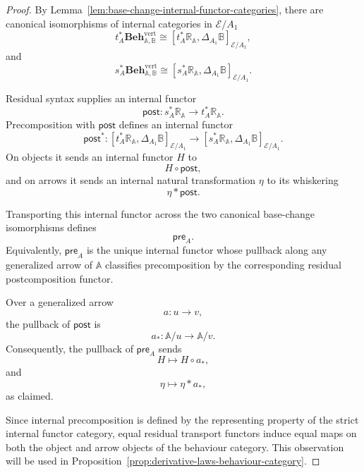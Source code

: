 \begin{proof}
    By Lemma~\ref{lem:base-change-internal-functor-categories}, there are
    canonical isomorphisms of internal categories in \(\mathcal E/A_1\)
    \[
        t_A^*
        \mathbf{Beh}^{\mathrm{vert}}_{\mathbb A,\mathbb B}
        \cong
        [t_A^*\mathbb R_{\mathbb A},
         \Delta_{A_1}\mathbb B]_{\mathcal E/A_1},
    \]
    and
    \[
        s_A^*
        \mathbf{Beh}^{\mathrm{vert}}_{\mathbb A,\mathbb B}
        \cong
        [s_A^*\mathbb R_{\mathbb A},
         \Delta_{A_1}\mathbb B]_{\mathcal E/A_1}.
    \]

    Residual syntax supplies an internal functor
    \[
        \mathsf{post}:
        s_A^*\mathbb R_{\mathbb A}
        \longrightarrow
        t_A^*\mathbb R_{\mathbb A}.
    \]
    Precomposition with \(\mathsf{post}\) defines an internal functor
    \[
        \mathsf{post}^*:
        [t_A^*\mathbb R_{\mathbb A},
         \Delta_{A_1}\mathbb B]_{\mathcal E/A_1}
        \longrightarrow
        [s_A^*\mathbb R_{\mathbb A},
         \Delta_{A_1}\mathbb B]_{\mathcal E/A_1}.
    \]
    On objects it sends an internal functor \(H\) to
    \[
        H\circ\mathsf{post},
    \]
    and on arrows it sends an internal natural transformation \(\eta\) to
    its whiskering
    \[
        \eta\ast\mathsf{post}.
    \]

    Transporting this internal functor across the two canonical
    base-change isomorphisms defines
    \[
        \mathsf{pre}_A.
    \]
    Equivalently, \(\mathsf{pre}_A\) is the unique internal functor whose
    pullback along any generalized arrow of \(\mathbb A\) classifies
    precomposition by the corresponding residual postcomposition functor.

    Over a generalized arrow
    \[
        a:u\to v,
    \]
    the pullback of \(\mathsf{post}\) is
    \[
        a_*:\mathbb A/u\to\mathbb A/v.
    \]
    Consequently, the pullback of \(\mathsf{pre}_A\) sends
    \[
        H\longmapsto H\circ a_*,
    \]
    and
    \[
        \eta\longmapsto\eta\ast a_*,
    \]
    as claimed.

    Since internal precomposition is defined by the representing property
    of the strict internal functor category, equal residual transport
    functors induce equal maps on both the object and arrow objects of the
    behaviour category. This observation will be used in
    Proposition~\ref{prop:derivative-laws-behaviour-category}.
\end{proof}

